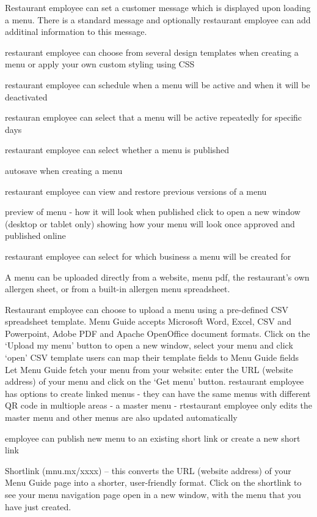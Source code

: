 
  Restaurant employee can set a customer message which is displayed upon loading a menu.
  There is a standard message and optionally restaurant employee can add additinal information to this message.

  restaurant employee can choose from several design templates when creating a menu or apply your own custom styling using CSS

  restaurant employee can schedule when a menu will be active and when it will be deactivated

  restauran employee can select that a menu will be active repeatedly for specific days

  restaurant employee can select whether a menu is published

  autosave when creating a menu

  restaurant employee can view and restore previous versions of a menu 

  preview of menu - how it will look when published
  click to open a new window (desktop or tablet only) showing how your menu will look once approved and published online

  restaurant employee can select for which business a menu will be created for

  A menu can be uploaded directly from a website, menu pdf, the restaurant's own allergen sheet, or from a built-in allergen menu spreadsheet. 

  Restaurant employee can choose to upload a menu using a pre-defined CSV spreadsheet template.
  Menu Guide accepts Microsoft Word, Excel, CSV and Powerpoint, Adobe PDF and Apache
  OpenOffice document formats. Click on the ‘Upload my menu’ button to open a new
  window, select your menu and click ‘open’
  CSV template users can map their template fields to Menu Guide fields
  Let Menu Guide fetch your menu from your website: enter the URL (website address) of your menu and click on the ‘Get menu’ button.
  restaurant employee has options to create linked menus - they can have the same menus with different QR code in multiople areas - a master menu - rtestaurant employee only edits the master menu and other menus are also updated automatically

  employee can publish new menu to an existing short link or create a new short link 

  Shortlink (mnu.mx/xxxx) – this converts the URL (website address) of your Menu Guide
  page into a shorter, user-friendly format. Click on the shortlink to see your menu navigation page open in a new window, with the menu that you have just created.

